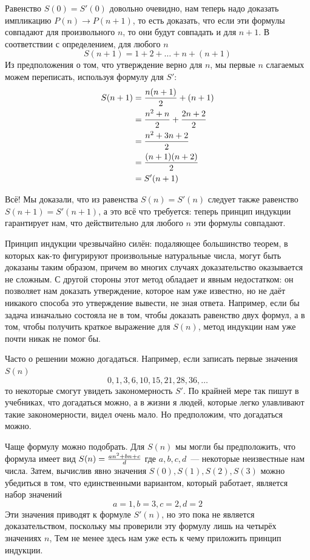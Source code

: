 Равенство $S(0) = S'(0)$ довольно очевидно, нам теперь надо доказать импликацию $P(n)\to P(n + 1)$, то есть доказать, что если эти формулы совпадают для произвольного $n$, то они будут совпадать и для $n + 1$. В соответствии с определением, для любого $n$
$$S(n + 1) = 1 + 2 + \ldots + n + (n + 1)$$
Из предположения о том, что утверждение верно для $n$, мы первые $n$ слагаемых можем переписать, используя формулу для $S'$:
\begin{align*}
S(n + 1) &= {n(n + 1)\over 2} + (n + 1)\\
	&= {n^2 + n\over 2} + {2n + 2\over 2} \\
	&= {n^ 2 + 3n + 2 \over 2} \\
	&= {(n + 1)(n + 2)\over 2} \\
	&= {S'(n + 1)}
\end{align*}

Всё! Мы доказали, что из равенства $S(n)=S'(n)$ следует также равенство $S(n+1)=S'(n+1)$, а это всё что требуется: теперь принцип индукции гарантирует нам, что действительно для любого $n$ эти формулы совпадают.

Принцип индукции чрезвычайно силён: подаляющее большинство теорем, в которых как-то фигурируют произвольные натуральные числа, могут быть доказаны таким образом, причем во многих случаях доказательство оказывается не сложным. С другой стороны этот метод обладает и явным недостатком: он позволяет нам доказать утверждение, которое нам уже известно, но не даёт никакого способа это утверждение вывести, не зная ответа. Например, если бы задача изначально состояла не в том, чтобы доказать равенство двух формул, а в том, чтобы получить краткое выражение для $S(n)$, метод индукции нам уже почти никак не помог бы.

Часто о решении можно догадаться. Например, если записать первые значения $S(n)$
$$0, 1, 3, 6, 10, 15, 21, 28, 36, \ldots$$
то некоторые смогут увидеть закономерность $S'$. По крайней мере так пишут в учебниках, что догадаться можно, а в жизни я людей, которые легко улавливают такие закономерности, видел очень мало. Но предположим, что догадаться можно.

Чаще формулу можно подобрать. Для $S(n)$ мы могли бы предположить, что формула имеет вид
$S(n) = {an^2 + bn + c\over d}$
где $a, b, c, d$~— некоторые неизвестные нам числа. Затем, вычислив явно значения $S(0), S(1), S(2), S(3)$ можно убедиться в том, что единственными вариантом, который работает, является набор значений
$$a=1, b=3, c=2, d=2$$
Эти значения приводят к формуле $S'(n)$, но это пока не является доказательством, поскольку мы проверили эту формулу лишь на четырёх значениях $n$, Тем не менее здесь нам уже есть к чему приложить принцип индукции.

